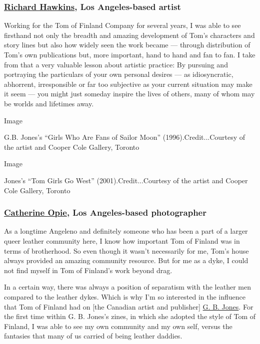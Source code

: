 \hypertarget{richard-hawkins-los-angeles-based-artist}{%
\subsubsection{\texorpdfstring{\textbf{\href{https://tmagazine.blogs.nytimes3xbfgragh.onion/2010/05/27/seeing-things-richard-hawkinss-haunted-houses/}{Richard
Hawkins}, Los Angeles-based
artist}}{Richard Hawkins, Los Angeles-based artist}}\label{richard-hawkins-los-angeles-based-artist}}

Working for the Tom of Finland Company for several years, I was able to
see firsthand not only the breadth and amazing development of Tom's
characters and story lines but also how widely seen the work became ---
through distribution of Tom's own publications but, more important, hand
to hand and fan to fan. I take from that a very valuable lesson about
artistic practice: By pursuing and portraying the particulars of your
own personal desires --- as idiosyncratic, abhorrent, irresponsible or
far too subjective as your current situation may make it seem --- you
might just someday inspire the lives of others, many of whom may be
worlds and lifetimes away.

Image

G.B. Jones's ``Girls Who Are Fans of Sailor Moon''
(1996).Credit...Courtesy of the artist and Cooper Cole Gallery, Toronto

Image

Jones's ``Tom Girls Go West'' (2001).Credit...Courtesy of the artist and
Cooper Cole Gallery, Toronto

\hypertarget{catherine-opie-los-angeles-based-photographer}{%
\subsubsection{\texorpdfstring{\textbf{\href{https://www.nytimes3xbfgragh.onion/2019/10/02/t-magazine/catherine-opie.html}{Catherine
Opie}, Los Angeles-based
photographer}}{Catherine Opie, Los Angeles-based photographer}}\label{catherine-opie-los-angeles-based-photographer}}

As a longtime Angeleno and definitely someone who has been a part of a
larger queer leather community here, I know how important Tom of Finland
was in terms of brotherhood. So even though it wasn't necessarily for
me, Tom's house always provided an amazing community resource. But for
me as a dyke, I could not find myself in Tom of Finland's work beyond
drag.

In a certain way, there was always a position of separatism with the
leather men compared to the leather dykes. Which is why I'm so
interested in the influence that Tom of Finland had on {[}the Canadian
artist and publisher{]}
\href{https://coopercolegallery.com/artist/g-b-jones/}{G. B. Jones}. For
the first time within G. B. Jones's zines, in which she adopted the
style of Tom of Finland, I was able to see my own community and my own
self, versus the fantasies that many of us carried of being leather
daddies.

